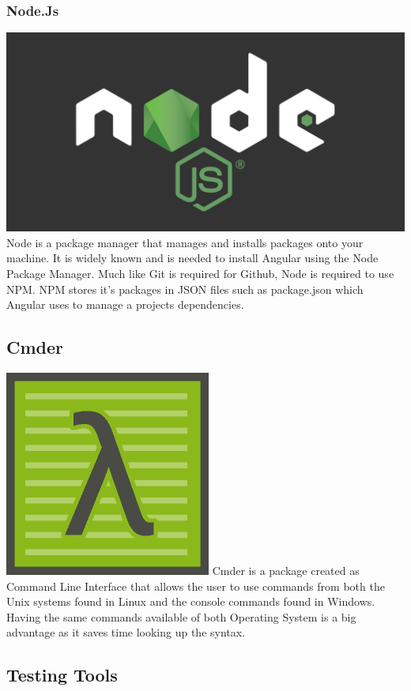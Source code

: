 \subsubsection{Node.Js}
\includegraphics[scale=0.025]{./img/node.png}
Node is a package manager that manages and installs packages onto your machine. It is widely known and is needed to install Angular using the Node Package Manager. Much like Git is required for Github, Node is required to use NPM. NPM stores it's packages in JSON files such as package.json which Angular uses to manage a projects dependencies.


\subsection{Cmder}
\includegraphics[scale=0.155]{./img/Cmder.PNG}
Cmder is a package created as Command Line Interface that allows the user to use commands from both the Unix systems found in Linux and the console commands found in Windows. Having the same commands available of both Operating System is a big advantage as it saves time looking up the syntax.


\subsection{Testing Tools}
